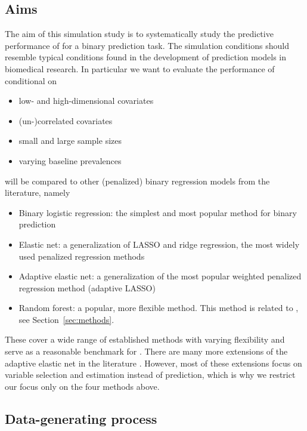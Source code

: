 \subsection{Aims} \label{sec:aims}

The aim of this simulation study is to systematically study the predictive
performance of \ainet{} for a binary prediction task. The simulation conditions
should resemble typical conditions found in the development of prediction models
in biomedical research. In particular we want to evaluate the performance of
\ainet{} conditional on
\begin{itemize}
  \item low- and high-dimensional covariates
  \item (un-)correlated covariates
  \item small and large sample sizes
  \item varying baseline prevalences
\end{itemize}
\ainet{} will be compared to other (penalized) binary regression models
from the literature, namely
\begin{itemize}
  \item Binary logistic regression: the simplest and most popular method for
        binary prediction
  \item Elastic net: a generalization of LASSO and ridge regression, the most
        widely used penalized regression methods
  \item Adaptive elastic net: a generalization of the most popular weighted 
  penalized regression method (adaptive LASSO)
  \item Random forest: a popular, more flexible method. This method is related to
        \ainet{}, see Section~\ref{sec:methods}.
\end{itemize}
These cover a wide range of established methods with varying flexibility and
serve as a reasonable benchmark for \ainet. There are many more extensions of
the adaptive elastic net in the literature \citep[see \eg{} the review
by][]{Vidaurre2013}. However, most of these extensions focus on variable
selection and estimation instead of prediction, which is why we restrict our
focus only on the four methods above.

\subsection{Data-generating process} \label{sec:dgp}


